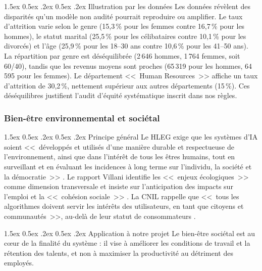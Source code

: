 \documentclass[12pt,a4paper]{article}
\makeatletter
\renewcommand\paragraph{\@startsection{paragraph}{4}{\z@}%
  {1.5ex \@plus 0.5ex \@minus .2ex}%
  {0.5ex \@plus .2ex}%
  {\normalfont\normalsize\bfseries}}
\makeatother
\begin{document}
\paragraph{Illustration par les données}
Les données révèlent des disparités qu'un modèle non audité pourrait reproduire ou amplifier. Le taux d'attrition varie selon le genre (15,3\,\% pour les femmes contre 16,7\,\% pour les hommes), le statut marital (25,5\,\% pour les célibataires contre 10,1\,\% pour les divorcés) et l'âge (25,9\,\% pour les 18--30 ans contre 10,6\,\% pour les 41--50 ans). La répartition par genre est déséquilibrée (2\,646 hommes, 1\,764 femmes, soit 60/40), tandis que les revenus moyens sont proches (65\,319 pour les hommes, 64\,595 pour les femmes). Le département <<~Human Resources~>> affiche un taux d'attrition de 30,2\,\%, nettement supérieur aux autres départements (15\,\%). Ces déséquilibres justifient l'audit d'équité systématique inscrit dans nos règles.

\subsubsection{Bien-être environnemental et sociétal}

\paragraph{Principe général}
Le HLEG exige que les systèmes d'IA soient <<~développés et utilisés d'une manière durable et respectueuse de l'environnement, ainsi que dans l'intérêt de tous les êtres humains, tout en surveillant et en évaluant les incidences à long terme sur l'individu, la société et la démocratie~>> \cite{ia_act}. Le rapport Villani identifie les <<~enjeux écologiques~>> comme dimension transversale et insiste sur l'anticipation des impacts sur l'emploi et la <<~cohésion sociale~>> \cite{villani}. La CNIL rappelle que <<~tous les algorithmes doivent servir les intérêts des utilisateurs, en tant que citoyens et communautés~>>, au-delà de leur statut de consommateurs \cite{cnil_ethique}.

\paragraph{Application à notre projet}
Le bien-être sociétal est au c\oe ur de la finalité du système : il vise à améliorer les conditions de travail et la rétention des talents, et non à maximiser la productivité au détriment des employés.
\end{document}
